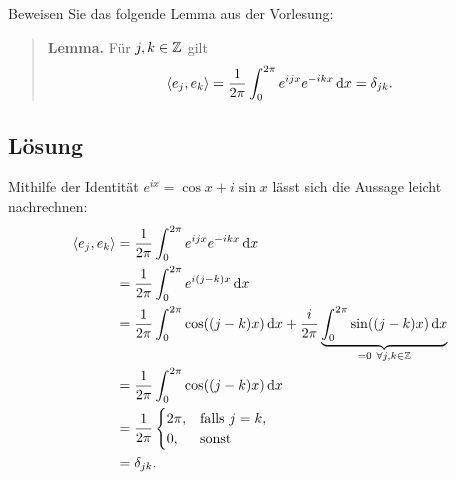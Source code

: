 \documentclass{exercise}
\begin{document}
    \begin{problem}
        Beweisen Sie das folgende Lemma aus der Vorlesung:
        \begin{quote}
            \textbf{\sffamily Lemma.} Für \(j, k \in \Z\) gilt
            \[
                \angles*{e_j, e_k} = \frac{1}{2\pi}\int_0^{2\pi}e^{ijx}e^{-ikx}\d x = \delta_{jk}.
            \]
        \end{quote}
    \end{problem}

    \subsection*{Lösung}
    Mithilfe der Identität \(e^{ix} = \cos x + i\sin x\) lässt sich die Aussage leicht nachrechnen:
    \begin{align*}
        \angles*{e_j, e_k} &= \frac{1}{2\pi}\int_0^{2\pi}e^{ijx}e^{-ikx}\d x\\
        &= \frac{1}{2\pi}\int_0^{2\pi}e^{i\parentheses*{j - k}x}\d x\\
        &= \frac{1}{2\pi}\int_0^{2\pi}\cos\parentheses*{\parentheses*{j - k}x}\d x + \frac{i}{2\pi}\underbrace{\int_0^{2\pi}\sin\parentheses*{\parentheses*{j - k}x}\d x}_{= 0\ \forall j, k \in \Z}\\
        &= \frac{1}{2\pi}\int_0^{2\pi}\cos\parentheses*{\parentheses*{j - k}x}\d x\\
        &= \frac{1}{2\pi}\begin{cases}
            2\pi, & \text{falls }j = k,\\
            0, & \text{sonst}
        \end{cases}\\
        &= \delta_{jk}.
    \end{align*}
\end{document}
